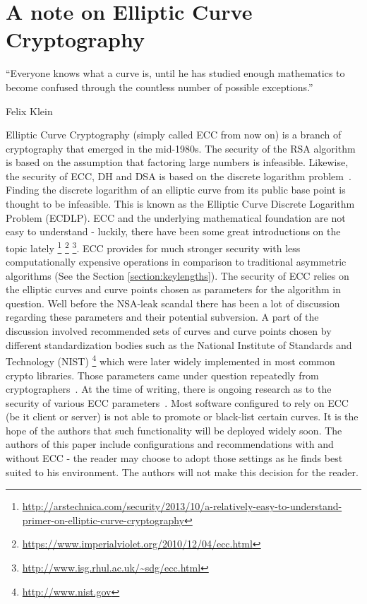 \section{A note on Elliptic Curve Cryptography}
\label{section:EllipticCurveCryptography}


\epigraph{``Everyone knows what a curve is, until he has studied enough
mathematics to become confused through the countless number of possible
exceptions.''}{Felix Klein }

Elliptic Curve Cryptography (simply called ECC from now on) is a branch of
cryptography that emerged in the mid-1980s.  The security of the RSA
algorithm is based on the assumption that factoring large numbers is infeasible.
Likewise, the security of ECC, DH and DSA is based on the discrete logarithm
problem~\cite{Wikipedia:Discrete,McC90,WR13}.  Finding the discrete logarithm of
an elliptic curve from its public base point is thought to be infeasible. This
is known as the Elliptic Curve Discrete Logarithm Problem (ECDLP). ECC and the
underlying mathematical foundation are not easy to understand - luckily, there
have been some great introductions on the topic lately
\footnote{\url{http://arstechnica.com/security/2013/10/a-relatively-easy-to-understand-primer-on-elliptic-curve-cryptography}}
\footnote{\url{https://www.imperialviolet.org/2010/12/04/ecc.html}}
\footnote{\url{http://www.isg.rhul.ac.uk/~sdg/ecc.html}}.
ECC provides for much stronger security with less computationally expensive
operations in comparison to traditional asymmetric algorithms (See the Section
\ref{section:keylengths}).
The security of ECC relies on the elliptic curves and curve points chosen as
parameters for the algorithm in question. Well before the NSA-leak scandal
there has been a lot of discussion regarding these parameters and their
potential subversion. A part of the discussion involved recommended sets of
curves and curve points chosen by different standardization bodies such as the
National Institute of Standards and Technology (NIST)
\footnote{\url{http://www.nist.gov}} which were later widely implemented in
most common crypto libraries. Those parameters came under question repeatedly
from cryptographers~\cite{BL13,Sch13b,W13}.  At the time of writing, there is
ongoing research as to the security of various ECC parameters~\cite{DJBSC}.
Most software configured to rely on ECC (be it client or server) is not able to
promote or black-list certain curves. It is the hope of the authors that such
functionality will be deployed widely soon.  The authors of this paper include
configurations and recommendations with and without ECC - the reader may choose
to adopt those settings as he finds best suited to his environment. The authors
will not make this decision for the reader.


